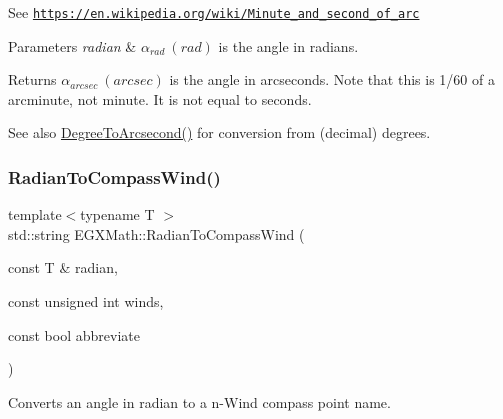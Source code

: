 See \href{https://en.wikipedia.org/wiki/Minute_and_second_of_arc}{\tt https\+://en.\+wikipedia.\+org/wiki/\+Minute\+\_\+and\+\_\+second\+\_\+of\+\_\+arc} 
\begin{DoxyParams}{Parameters}
{\em radian} & $\alpha_{rad}\ (rad)$ is the angle in radians. \\
\hline
\end{DoxyParams}
\begin{DoxyReturn}{Returns}
$\alpha_{arcsec}\ (arcsec)$ is the angle in arcseconds. Note that this is 1/60 of a arcminute, not minute. It is not equal to seconds. 
\end{DoxyReturn}
\begin{DoxySeeAlso}{See also}
\mbox{\hyperlink{group___e_g_x_math-_angle_conversions-_degree_gaf85e2d765c248f447854a807a68a5de8}{Degree\+To\+Arcsecond()}} for conversion from (decimal) degrees. 
\end{DoxySeeAlso}
\mbox{\label{group___e_g_x_math-_angle_conversions-_radian_ga4d845b171148481aa7e85018d6dad035}} 
\subsubsection{\texorpdfstring{Radian\+To\+Compass\+Wind()}{RadianToCompassWind()}}
{\footnotesize\ttfamily template$<$typename T $>$ \\
std\+::string E\+G\+X\+Math\+::\+Radian\+To\+Compass\+Wind (\begin{DoxyParamCaption}\item[{const T \&}]{radian,  }\item[{const unsigned int}]{winds,  }\item[{const bool}]{abbreviate }\end{DoxyParamCaption})}



Converts an angle in radian to a n-\/\+Wind compass point name. 

